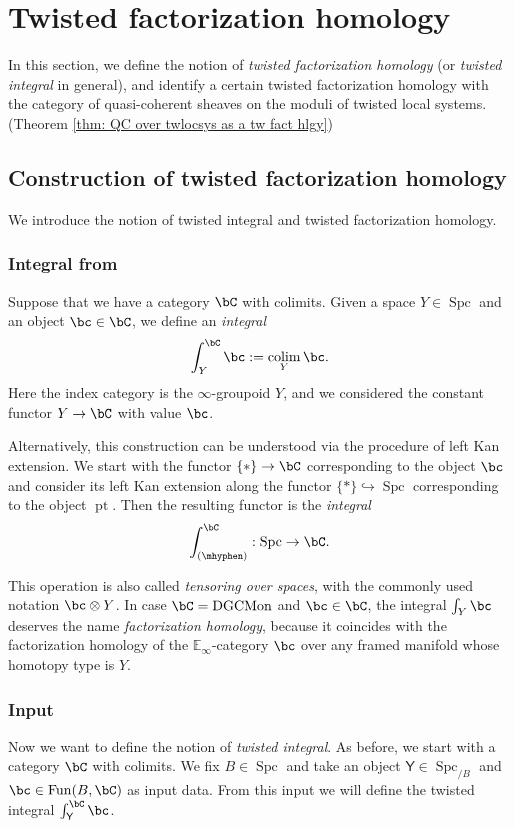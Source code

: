 \documentclass[10pt]{amsart}
\newcommand{\sssec}{\subsubsection}
\theoremstyle{remark}
\newcommand{\E}{\mathbb{E}}
\newcommand{\on}{\operatorname}
\newcommand{\DGCatSymMon}{\on{DGCMon}}
\newcommand{\Spc}{\on{Spc}}
\newcommand{\Fun}{\on{Fun}}
\DeclareMathOperator{\colim}{colim}
\newcommand{\pt}{\on{pt}}
\newcommand{\sfY}{\mathsf{Y}}
\begin{document}
\section{Twisted factorization homology}\label{sec: twisted fact hlgy}
In this section, we define the notion of \emph{twisted factorization homology} (or \emph{twisted integral} in general), and identify a certain twisted factorization homology with the category of quasi-coherent sheaves on the moduli of twisted local systems. (Theorem \ref{thm: QC over twlocsys as a tw fact hlgy})


\subsection{Construction of twisted factorization homology} We introduce the notion of twisted integral and twisted factorization homology.
\sssec{Integral from \cite{GKRV}}\label{sssec: GKRV fact hlgy}
Suppose that we have a category $\bC$ with colimits. Given a space $Y\in\Spc$ and an object $\bc\in\bC$, we define an \emph{integral}
\[\int^{\bC}_Y \bc := \colim_Y \bc.\]
Here the index category is the $\infty$-groupoid $Y$, and we considered the constant functor $Y\rightarrow \bC$ with value $\bc$.
\medskip

Alternatively, this construction can be understood via the procedure of left Kan extension. We start with the functor $\{*\}\rightarrow\bC$ corresponding to the object $\bc$
and consider its left Kan extension along the functor 
$\{*\}\hookrightarrow \Spc$ corresponding to the object $\pt$.
Then the resulting functor is the \emph{integral}
\[\int^{\bC}_{(\mhyphen)}:\Spc\rightarrow\bC.\]

This operation is also called \emph{tensoring over spaces}, with the commonly used notation $\bc\otimes Y$.
In case $\bC=\DGCatSymMon$ and $\bc\in\bC$, the integral $\int_Y\bc$ deserves the name \emph{factorization homology}, because it coincides with the factorization homology of the $\E_{\infty}$-category $\bc$ over any framed manifold whose homotopy type is $Y$.

\sssec{Input}\label{sssec: fact hlgy setup}
Now we want to define the notion of \textit{twisted integral}. As before, we start with a category $\bC$ with colimits. We fix $B\in\Spc$ and take an object $\sfY\in\Spc_{/B}$ and $\bc\in \Fun(B,\bC)$ as input data. From this input we will define the twisted integral $\int^{\bC}_{\sfY}\bc$.
\end{document}
